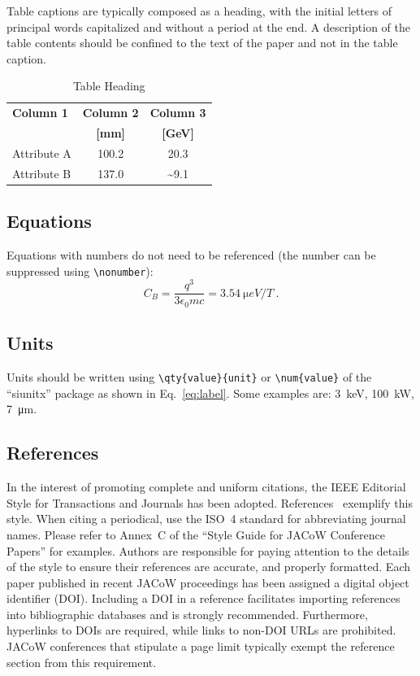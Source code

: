 Table captions are typically composed as a heading, with the initial letters of principal words capitalized and without a period at the end. A description of the table contents should be confined to the text of the paper and not in the table caption. 
\begin{table}[!hbt]
   \centering
   \caption{Table Heading}
   \begin{tabular}{lcc}
       \toprule
       \textbf{Column 1} & \textbf{Column 2} & \textbf{Column 3} \\ 
                         & \textbf{[mm]}     & \textbf{[GeV]}	 \\
       \midrule
          Attribute A    & \num{100.2}       & \num{20.3}        \\
          Attribute B    & \num{137.0}       & \num{~9.1}        \\
       \bottomrule
   \end{tabular}
   \label{tab:example}
\end{table}

\subsection{Equations}

Equations with numbers do not need to be referenced (the number can be suppressed using \verb|\nonumber|):
\begin{equation}\label{eq:label}
    C_B=\frac{q^3}{3\epsilon_{0}mc} = \qty{3.54}{\micro eV/T}\ .
\end{equation}

\subsection{Units}

Units should be written using \verb|\qty{value}{unit}| or \verb|\num{value}| of the “siunitx” package as shown in Eq.~\eqref{eq:label}. Some examples are: \qty{3}{keV}, \qty{100}{kW}, \qty{7}{\um}.

\subsection{References}

In the interest of promoting complete and uniform citations, 
the IEEE Editorial Style for Transactions and Journals has been adopted. 
References~\cite{ref:jacow-paper, ref:journal-paper} exemplify this style. 
When citing a periodical, use the ISO~4 standard for abbreviating journal names. 
Please refer to Annex~C of the “Style Guide for JACoW Conference Papers” for examples. 
Authors are responsible for paying attention to the details of the style to ensure their references are 
accurate, and properly formatted. 
Each paper published in recent JACoW proceedings has been assigned a digital object identifier (DOI). Including a DOI in a reference facilitates importing references into bibliographic databases and is strongly recommended. 
Furthermore, hyperlinks to DOIs are required, while links to non-DOI URLs are prohibited. 
JACoW conferences that stipulate a page limit typically exempt the reference section from this requirement.
